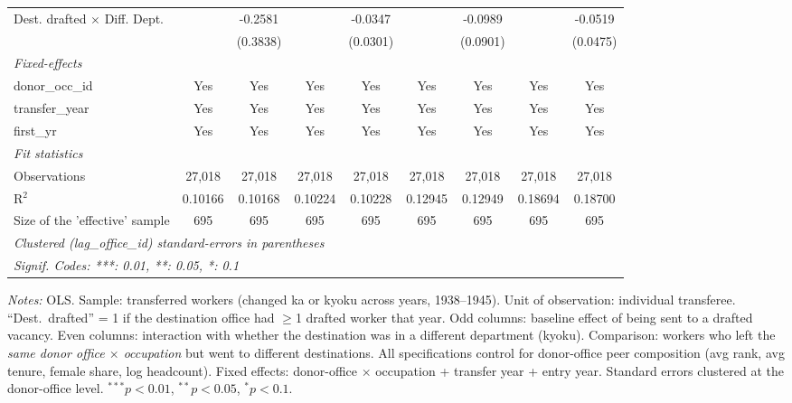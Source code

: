 \begin{table}[htbp]
\begin{threeparttable}
\begin{tabular}{lcccccccc}
   Dest. drafted $\times$ Diff. Dept.  &                & -0.2581        &                 & -0.0347         &                & -0.0989              &               & -0.0519\\   
                                       &                & (0.3838)       &                 & (0.0301)        &                & (0.0901)             &               & (0.0475)\\   
   \midrule
   \emph{Fixed-effects}\\
   donor\_occ\_id                      & Yes            & Yes            & Yes             & Yes             & Yes            & Yes                  & Yes           & Yes\\  
   transfer\_year                      & Yes            & Yes            & Yes             & Yes             & Yes            & Yes                  & Yes           & Yes\\  
   first\_yr                           & Yes            & Yes            & Yes             & Yes             & Yes            & Yes                  & Yes           & Yes\\  
   \midrule
   \emph{Fit statistics}\\
   Observations                        & 27,018         & 27,018         & 27,018          & 27,018          & 27,018         & 27,018               & 27,018        & 27,018\\  
   R$^2$                               & 0.10166        & 0.10168        & 0.10224         & 0.10228         & 0.12945        & 0.12949              & 0.18694       & 0.18700\\  
   Size of the 'effective' sample      & 695            & 695            & 695             & 695             & 695            & 695                  & 695           & 695\\  
   \midrule \midrule
   \multicolumn{9}{l}{\emph{Clustered (lag\_office\_id) standard-errors in parentheses}}\\
   \multicolumn{9}{l}{\emph{Signif. Codes: ***: 0.01, **: 0.05, *: 0.1}}\\
\end{tabular}
\begin{tablenotes}[flushleft]\footnotesize
\item \textit{Notes:} OLS. Sample: transferred workers (changed ka or kyoku across years, 1938--1945). Unit of observation: individual transferee. ``Dest.\ drafted'' = 1 if the destination office had $\geq$1 drafted worker that year. Odd columns: baseline effect of being sent to a drafted vacancy. Even columns: interaction with whether the destination was in a different department (kyoku). Comparison: workers who left the \emph{same donor office $\times$ occupation} but went to different destinations. All specifications control for donor-office peer composition (avg rank, avg tenure, female share, log headcount). Fixed effects: donor-office $\times$ occupation + transfer year + entry year. Standard errors clustered at the donor-office level. $^{***}p<0.01$, $^{**}p<0.05$, $^{*}p<0.1$.
\end{tablenotes}\end{threeparttable}\end{table}

